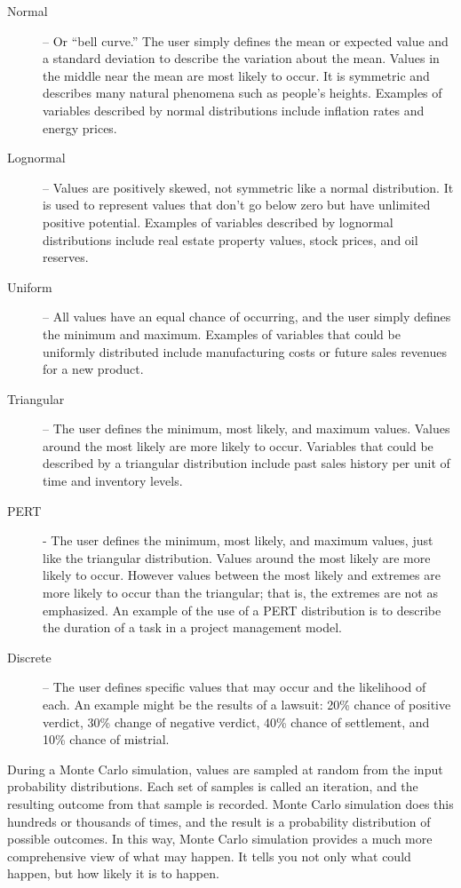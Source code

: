 \begin{description}
\item[Normal] – Or “bell curve.”  The user simply defines the mean or expected value and a standard deviation to describe the variation about the mean.  Values in the middle near the mean are most likely to occur.  It is symmetric and describes many natural phenomena such as people’s heights.  Examples of variables described by normal distributions include inflation rates and energy prices.

\item[Lognormal] – Values are positively skewed, not symmetric like a normal distribution.  It is used to represent values that don’t go below zero but have unlimited positive potential.  Examples of variables described by lognormal distributions include real estate property values, stock prices, and oil reserves.

\item[Uniform] – All values have an equal chance of occurring, and the user simply defines the minimum and maximum.  Examples of variables that could be uniformly distributed include manufacturing costs or future sales revenues for a new product.

\item[Triangular] – The user defines the minimum, most likely, and maximum values.  Values around the most likely are more likely to occur.  Variables that could be described by a triangular distribution include past sales history per unit of time and inventory levels.

\item[PERT]- The user defines the minimum, most likely, and maximum values, just like the triangular distribution.  Values around the most likely are more likely to occur.  However values between the most likely and extremes are more likely to occur than the triangular; that is, the extremes are not as emphasized.  An example of the use of a PERT distribution is to describe the duration of a task in a project management model.

\item[Discrete] – The user defines specific values that may occur and the likelihood of each.  An example might be the results of a lawsuit: 20\% chance of positive verdict, 30\% change of negative verdict, 40\% chance of settlement, and 10\% chance of mistrial.
\end{description}

During a Monte Carlo simulation, values are sampled at random from the input probability distributions.  Each set of samples is called an iteration, and the resulting outcome from that sample is recorded.  Monte Carlo simulation does this hundreds or thousands of times, and the result is a probability distribution of possible outcomes.  In this way, Monte Carlo simulation provides a much more comprehensive view of what may happen.  It tells you not only what could happen, but how likely it is to happen.

